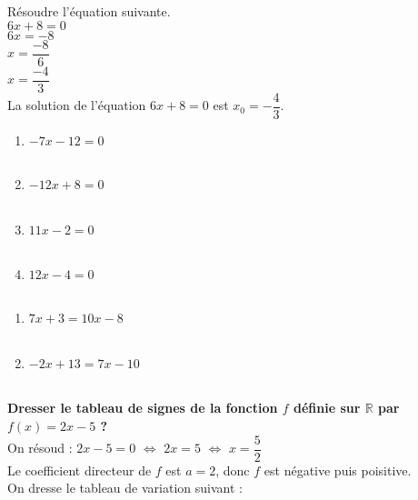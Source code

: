 \documentclass[11pt]{article}
\begin{document}

\begin{exercice}
Résoudre l'équation suivante. \\
$6x+8=0$\\
$6x=-8$ \\
$x=\dfrac{-8}{6}$\\
$x=\dfrac{-4}{3}$\\
La solution de l'équation $6x+8=0$ est $x_0=-\dfrac{4}{3}$.
\end{exercice}

\begin{exercice}
\begin{multicols}{2}
\begin{enumerate}
\item $-7x-12=0$ \\ \\ \encart{3cm}
\item $-12x+8=0$ \\ \\ \encart{3cm}
\item $11x-2=0$ \\ \\ \encart{3cm}
\item $12x-4=0$ \\ \\ \encart{3cm}
\end{enumerate}
\end{multicols}
\end{exercice}

\begin{exercice}
\begin{multicols}{2}
\begin{enumerate}
\item $7x+3=10x-8$ \\ \\ \encart{4cm}
\item $-2x+13=7x-10$ \\ \\ \encart{4cm}
\end{enumerate}
\end{multicols}
\end{exercice}


\begin{exercice}
\textbf{Dresser le tableau de signes de la fonction $f$ définie sur  $\mathbb
R$ par $f(x)=2x-5$ ?} \\
On résoud : $2x-5=0$ $\iff$ $2x=5$ $\iff$ $x=\dfrac{5}{2}$ \\
Le coefficient directeur de $f$ est $a=2$, donc $f$ est négative puis
poisitive. \\
On dresse le tableau de variation suivant :
\begin{center}
\end{center}
\end{exercice}
\end{document}
